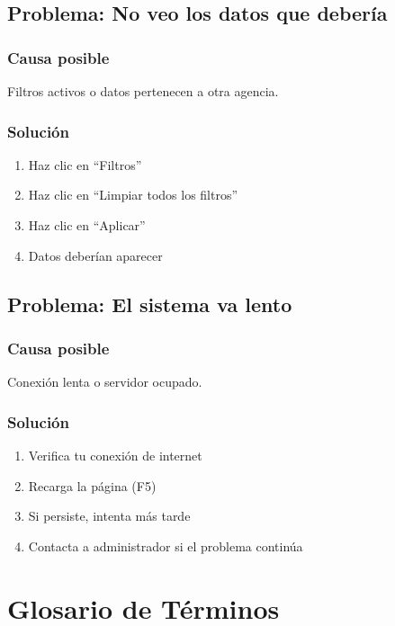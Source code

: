 \documentclass[12pt,a4paper,spanish,oneside]{report}
\begin{document}
\section{Problema: No veo los datos que debería}

\subsection{Causa posible}

Filtros activos o datos pertenecen a otra agencia.

\subsection{Solución}

\begin{enumerate}
    \item Haz clic en ``Filtros''
    \item Haz clic en ``Limpiar todos los filtros''
    \item Haz clic en ``Aplicar''
    \item Datos deberían aparecer
\end{enumerate}

\section{Problema: El sistema va lento}

\subsection{Causa posible}

Conexión lenta o servidor ocupado.

\subsection{Solución}

\begin{enumerate}
    \item Verifica tu conexión de internet
    \item Recarga la página (F5)
    \item Si persiste, intenta más tarde
    \item Contacta a administrador si el problema continúa
\end{enumerate}

\chapter{Glosario de Términos}
\end{document}
